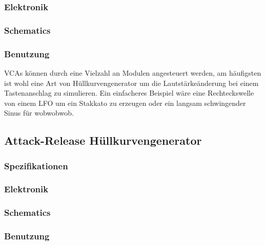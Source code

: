 \subsubsection{Elektronik}
\label{sec:org0dfb3a0}
\subsubsection{Schematics}
\label{sec:org7935693}
\subsubsection{Benutzung}
\label{sec:orgb9c9552}
VCAs können durch eine Vielzahl an Modulen angesteuert werden, am häufigsten ist wohl eine Art von Hüllkurvengenerator um die Lautstärkeänderung bei einem Tastenanschlag zu simulieren. Ein einfacheres Beispiel wäre eine Rechteckswelle von einem LFO um ein Stakkato zu erzeugen oder ein langsam schwingender Sinus für wobwobwob.

\subsection{Attack-Release Hüllkurvengenerator}
\label{sec:orgb1d6877}
\subsubsection{Spezifikationen}
\label{sec:org18686b9}
\subsubsection{Elektronik}
\label{sec:orgc6321c8}
\subsubsection{Schematics}
\label{sec:orgceb6d0a}
\subsubsection{Benutzung}
\label{sec:org076c691}
